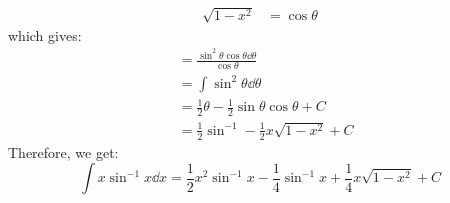 \begin{itemize}
\begin{example}
\begin{align}
            \sqrt{1-x^2} &= \cos\theta 
        \end{align}
        which gives:
        \begin{align}
            &= \frac{\sin^2 \theta \cos\theta \dd{\theta}}{\cos\theta} \\ 
            &= \int \sin^2 \theta \dd{\theta} \\ 
            &= \frac{1}{2}\theta - \frac{1}{2}\sin\theta\cos\theta + C \\ 
            &= \frac{1}{2}\sin^{-1} - \frac{1}{2}x\sqrt{1-x^2} + C
        \end{align}
        Therefore, we get:
        \begin{equation}
            \int x\sin^{-1} x \dd{x} = \frac{1}{2}x^2\sin^{-1}x - \frac{1}{4}\sin^{-1} x + \frac{1}{4} x \sqrt{1-x^2} + C
        \end{equation}
    \end{example}
\end{itemize}
